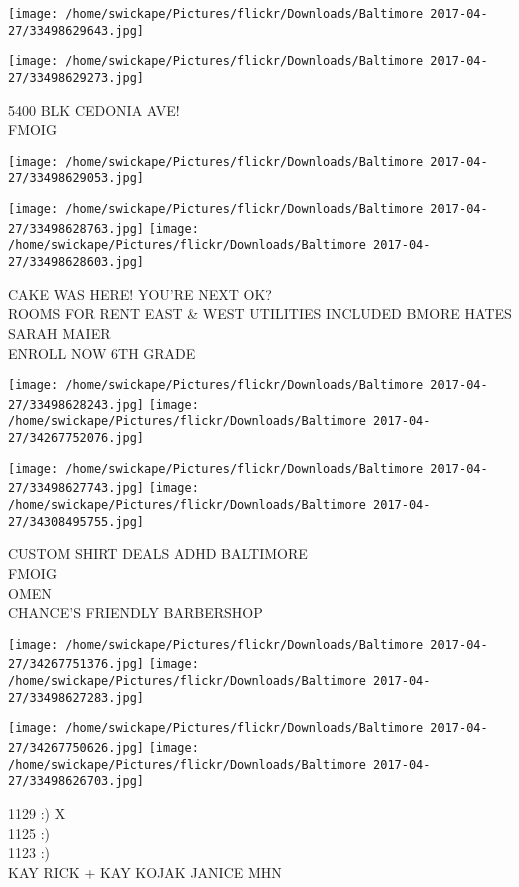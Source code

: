 \documentclass[10pt,letterpaper]{article}
\begin{document}
\texttt{[image: /home/swickape/Pictures/flickr/Downloads/Baltimore 2017-04-27/33498629643.jpg]}

\vspace{0.25in}
\texttt{[image: /home/swickape/Pictures/flickr/Downloads/Baltimore 2017-04-27/33498629273.jpg]}

5400 BLK CEDONIA AVE!\\
FMOIG
\pagebreak

\texttt{[image: /home/swickape/Pictures/flickr/Downloads/Baltimore 2017-04-27/33498629053.jpg]}

\vspace{0.25in}
\texttt{[image: /home/swickape/Pictures/flickr/Downloads/Baltimore 2017-04-27/33498628763.jpg]}
\texttt{[image: /home/swickape/Pictures/flickr/Downloads/Baltimore 2017-04-27/33498628603.jpg]}

CAKE WAS HERE!  YOU'RE NEXT OK?\\
ROOMS FOR RENT EAST \& WEST UTILITIES INCLUDED BMORE HATES SARAH MAIER\\
ENROLL NOW 6TH GRADE
\pagebreak

\texttt{[image: /home/swickape/Pictures/flickr/Downloads/Baltimore 2017-04-27/33498628243.jpg]}
\texttt{[image: /home/swickape/Pictures/flickr/Downloads/Baltimore 2017-04-27/34267752076.jpg]}

\texttt{[image: /home/swickape/Pictures/flickr/Downloads/Baltimore 2017-04-27/33498627743.jpg]}
\texttt{[image: /home/swickape/Pictures/flickr/Downloads/Baltimore 2017-04-27/34308495755.jpg]}

CUSTOM SHIRT DEALS ADHD BALTIMORE\\
FMOIG\\
OMEN\\
CHANCE'S FRIENDLY BARBERSHOP
\pagebreak

\texttt{[image: /home/swickape/Pictures/flickr/Downloads/Baltimore 2017-04-27/34267751376.jpg]}
\texttt{[image: /home/swickape/Pictures/flickr/Downloads/Baltimore 2017-04-27/33498627283.jpg]}

\texttt{[image: /home/swickape/Pictures/flickr/Downloads/Baltimore 2017-04-27/34267750626.jpg]}
\texttt{[image: /home/swickape/Pictures/flickr/Downloads/Baltimore 2017-04-27/33498626703.jpg]}

1129 :) X\\
1125 :)\\
1123 :)\\
KAY RICK + KAY KOJAK JANICE MHN
\pagebreak
\end{document}
